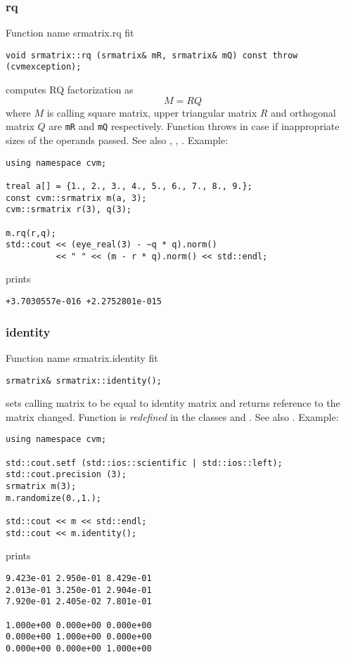 \subsubsection{rq}
Function%
\pdfdest name {srmatrix.rq} fit
\begin{verbatim}
void srmatrix::rq (srmatrix& mR, srmatrix& mQ) const throw (cvmexception);
\end{verbatim}
computes RQ factorization as
\begin{equation*}
M=RQ
\end{equation*}
where 
$M$ is  calling square matrix, upper triangular matrix $R$ 
and orthogonal matrix $Q$ are \verb"mR" and \verb"mQ"
respectively. 
Function throws
in case if inappropriate sizes of the operands passed.
See also , ,
.
Example:
\begin{Verbatim}
using namespace cvm;

treal a[] = {1., 2., 3., 4., 5., 6., 7., 8., 9.};
const cvm::srmatrix m(a, 3);
cvm::srmatrix r(3), q(3);

m.rq(r,q);
std::cout << (eye_real(3) - ~q * q).norm()
          << " " << (m - r * q).norm() << std::endl;
\end{Verbatim}
prints
\begin{Verbatim}
+3.7030557e-016 +2.2752801e-015
\end{Verbatim}
\newpage


\subsubsection{identity}
Function%
\pdfdest name {srmatrix.identity} fit
\begin{verbatim}
srmatrix& srmatrix::identity();
\end{verbatim}
sets  calling matrix to be equal to identity matrix
and returns  reference to
the matrix changed. 
Function is \emph{redefined} in the classes
 and
.
See also .
Example:
\begin{Verbatim}
using namespace cvm;

std::cout.setf (std::ios::scientific | std::ios::left); 
std::cout.precision (3);
srmatrix m(3);
m.randomize(0.,1.);

std::cout << m << std::endl;
std::cout << m.identity();
\end{Verbatim}
prints
\begin{Verbatim}
9.423e-01 2.950e-01 8.429e-01
2.013e-01 3.250e-01 2.904e-01
7.920e-01 2.405e-02 7.801e-01

1.000e+00 0.000e+00 0.000e+00
0.000e+00 1.000e+00 0.000e+00
0.000e+00 0.000e+00 1.000e+00
\end{Verbatim}
\newpage





